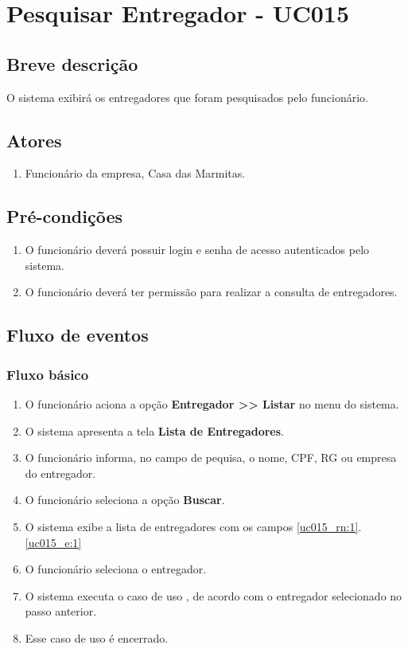 \chapter{Pesquisar Entregador - UC015} \label{uc015}

\section{Breve descrição}

O sistema exibirá os entregadores que foram pesquisados pelo funcionário.

\section{Atores}

\begin{enumerate}
	\item Funcionário da empresa, Casa das Marmitas.
\end{enumerate}

\section{Pré-condições}

\begin{enumerate}
	\item O funcionário deverá possuir login e senha de acesso autenticados pelo sistema.
	\item O funcionário deverá ter permissão para realizar a consulta de entregadores.
\end{enumerate}

\section{Fluxo de eventos}

\subsection{Fluxo básico}

\begin{enumerate}[label=P\arabic*]
	\item O funcionário aciona a opção \textbf{Entregador >> Listar} no menu do sistema.
	\item O sistema apresenta a tela \textbf{Lista de Entregadores}.	
	\item O funcionário informa, no campo de pequisa, o nome, CPF, RG ou empresa do entregador. \label{uc015_p:3}
	\item O funcionário seleciona a opção \textbf{Buscar}.
	\item O sistema exibe a lista de entregadores com os campos \ref{uc015_rn:1}. \ref{uc015_e:1}
	\item O funcionário seleciona o entregador.
	\item O sistema executa o caso de uso , de acordo com o entregador selecionado no passo anterior.
	\item Esse caso de uso é encerrado.
\end{enumerate}

